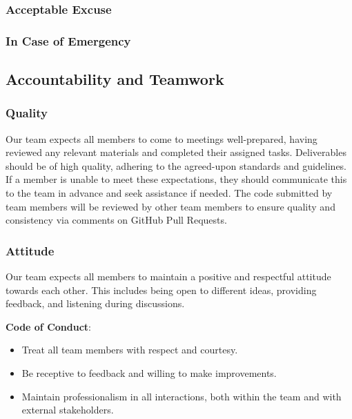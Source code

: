\documentclass{article}
\begin{document}

\subsubsection*{Acceptable Excuse}


\subsubsection*{In Case of Emergency}


\subsection*{Accountability and Teamwork}

\subsubsection*{Quality} 

Our team expects all members to come to meetings well-prepared, having reviewed any 
relevant materials and completed their assigned tasks. Deliverables should be of high 
quality, adhering to the agreed-upon standards and guidelines. If a member is unable 
to meet these expectations, they should communicate this to the team in advance and 
seek assistance if needed. The code submitted by team members will be reviewed by 
other team members to ensure quality and consistency via comments on GitHub Pull Requests.

\subsubsection*{Attitude}

Our team expects all members to maintain a positive and respectful attitude towards each other. 
This includes being open to different ideas, providing feedback, and  
listening during discussions.

\textbf{Code of Conduct}:
\begin{itemize}
    \item Treat all team members with respect and courtesy.
    \item Be receptive to feedback and willing to make improvements.
    \item Maintain professionalism in all interactions, both within the team and with external stakeholders.
\end{itemize}
\end{document}
